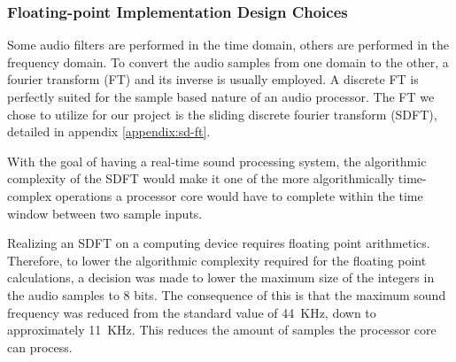 
\subsubsection{Floating-point Implementation Design Choices}

Some audio filters are performed in the time domain, others are performed in the
frequency domain. To convert the audio samples from one domain to the other, a
fourier transform (FT) and its inverse is usually employed. A discrete FT is
perfectly suited for the sample based nature of an audio processor. The FT we
chose to utilize for our project is the
sliding discrete fourier transform (SDFT), detailed in appendix \ref{appendix:sd-ft}.

With the goal of having a real-time sound processing system, the algorithmic
complexity of the SDFT would make it one of the more algorithmically
time-complex operations a processor core would have to complete within the
time window between two sample inputs.

Realizing an SDFT on a computing device requires floating point arithmetics.
Therefore, to lower the algorithmic complexity required for the floating point
calculations, a decision was made to lower the maximum size of the integers in
the audio samples to 8 bits. The consequence of this is that the maximum sound
frequency was reduced from the standard value of 44~KHz, down to approximately 11~KHz.
This reduces the amount of samples the processor core can process.

